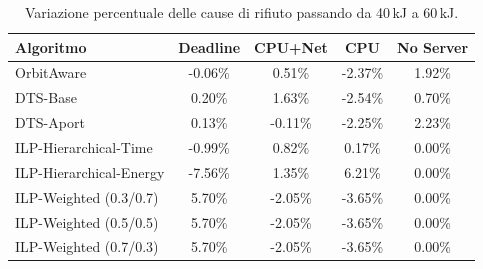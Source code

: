 \documentclass[12pt]{article}
\begin{document}
\begin{table}[h]
\centering

\label{tab:rejection_variation_corrected}
\begin{tabular}{lcccc}
\hline
\textbf{Algoritmo} & \textbf{Deadline} & \textbf{CPU+Net} & \textbf{CPU} & \textbf{No Server} \\
\hline
OrbitAware & -0.06\% & 0.51\% & -2.37\% & 1.92\% \\
DTS-Base & 0.20\% & 1.63\% & -2.54\% & 0.70\% \\
DTS-Aport & 0.13\% & -0.11\% & -2.25\% & 2.23\% \\
ILP-Hierarchical-Time & -0.99\% & 0.82\% & 0.17\% & 0.00\% \\
ILP-Hierarchical-Energy & -7.56\% & 1.35\% & 6.21\% & 0.00\% \\
ILP-Weighted (0.3/0.7) & 5.70\% & -2.05\% & -3.65\% & 0.00\% \\
ILP-Weighted (0.5/0.5) & 5.70\% & -2.05\% & -3.65\% & 0.00\% \\
ILP-Weighted (0.7/0.3) & 5.70\% & -2.05\% & -3.65\% & 0.00\% \\
\hline
\end{tabular}
\caption{Variazione percentuale delle cause di rifiuto passando da 40\,kJ a 60\,kJ.}
\end{table}
\FloatBarrier
\end{document}
